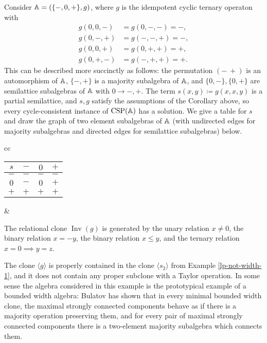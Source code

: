 \documentclass[letterpaper,11pt]{article}
\DeclareMathOperator{\Inv}{Inv}
\DeclareMathOperator{\CSP}{CSP}
\begin{document}
\begin{ex} Consider $\mathbb{A} = (\{-,0,+\},g)$, where $g$ is the idempotent cyclic ternary operaton with
\begin{align*}
g(0,0,-) &= g(0,-,-) = -,\\
g(0,-,+) &= g(-,-,+) = -,\\
g(0,0,+) &= g(0,+,+) = +,\\
g(0,+,-) &= g(-,+,+) = +.
\end{align*}
This can be described more succinctly as follows: the permutation $(-\ +)$ is an automorphism of $\mathbb{A}$, $\{-,+\}$ is a majority subalgebra of $\mathbb{A}$, and $\{0,-\}, \{0,+\}$ are semilattice subalgebras of $\mathbb{A}$ with $0 \rightarrow -,+$. The term $s(x,y) \coloneqq g(x,x,y)$ is a partial semilattice, and $s,g$ satisfy the assumptions of the Corollary above, so every cycle-consistent instance of $\CSP(\bA)$ has a solution. We give a table for $s$ and draw the graph of two element subalgebras of $\mathbb{A}$ (with undirected edges for majority subalgebras and directed edges for semilattice subalgebras) below.
\begin{center}
\begin{tabular}{cc}%
\begin{tabular}{c|ccc} $s$ & $-$ & $0$ & $+$\\ \hline $-$ & $-$ & $-$ & $-$\\ $0$ & $-$ & $0$ & $+$\\ $+$ & $+$ & $+$ & $+$\end{tabular} & 
\end{tabular}
\end{center}

The relational clone $\Inv(g)$ is generated by the unary relation $x \ne 0$, the binary relation $x = -y$, the binary relation $x \le y$, and the ternary relation $x = 0 \implies y = z$.

The clone $\langle g \rangle$ is properly contained in the clone $\langle s_2 \rangle$ from Example \ref{lp-not-width-1}, and it does not contain any proper subclone with a Taylor operation. In some sense the algebra considered in this example is the prototypical example of a bounded width algebra: Bulatov \cite{bulatov-bounded} has shown that in every minimal bounded width clone, the maximal strongly connected components behave as if there is a majority operation preserving them, and for every pair of maximal strongly connected components there is a two-element majority subalgebra which connects them.
\end{ex}
\end{document}
